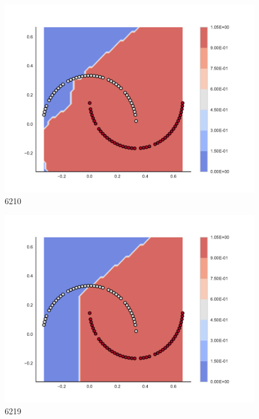 \begin{subfigure}[b]{0.09\textwidth}
    \includegraphics[clip, trim=2.35cm 1.75cm 4.5cm 0cm,width=\textwidth]{img/convergence/6210.pdf}
    \caption{6210}
    \label{fig:convergence_6210}
\end{subfigure}
%
\begin{subfigure}[b]{0.09\textwidth}
    \includegraphics[clip, trim=2.35cm 1.75cm 4.5cm 0cm,width=\textwidth]{img/convergence/6219.pdf}
    \caption{6219}
    \label{fig:convergence_6219}
\end{subfigure}
%
